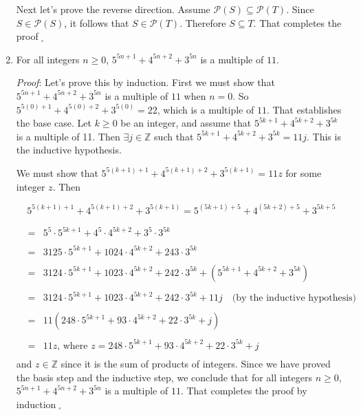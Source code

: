 \documentclass[12pt]{amsart}
\theoremstyle{definition}
\theoremstyle{remark}
\newcommand{\ints}{\mathbb Z}
\newcommand{\powerset}{\mathscr P}
\begin{document}
\begin{enumerate}
Next let's prove the reverse direction. Assume $\powerset{(S)}\subseteq \powerset{(T)}$. 
Since $S\in \powerset{(S)}$, it follows that $S\in \powerset{(T)}$. Therefore $S\subseteq T$. That completes the proof$\;_{\square}$\\

\newpage


\item For all integers $n\geq 0$, $5^{5n+1}+4^{5n+2}+3^{5n}$ is a multiple of $11$.


\bigskip
\bigskip

\emph{Proof}: Let's prove this by induction. First we must show that $5^{5n+1}+4^{5n+2}+3^{5n}$ is a multiple of $11$ when $n=0$.
So $5^{5(0)+1}+4^{5(0)+2}+3^{5(0)}=22$, which is a multiple of $11$. That establishes the base case.
Let $k\geq 0$ be an integer, and assume that $5^{5k+1}+4^{5k+2}+3^{5k}$ is a multiple of 11. 
Then $\exists j\in\ints$ such that $5^{5k+1}+4^{5k+2}+3^{5k}=11j$. This is the inductive hypothesis.

We must show that $5^{5(k+1)+1}+4^{5(k+1)+2}+3^{5(k+1)}=11z$ for some integer $z$. Then

$$5^{5(k+1)+1}+4^{5(k+1)+2}+3^{5(k+1)} = 5^{(5k+1)+5}+4^{(5k+2)+5}+3^{5k+5}$$

\begin{eqnarray*}
    &=& 5^5\cdot 5^{5k+1}+4^5\cdot 4^{5k+2}+3^5\cdot 3^{5k} \\
    \\
    &=& 3125\cdot 5^{5k+1}+1024\cdot 4^{5k+2}+243\cdot 3^{5k} \\
    \\
    &=& 3124\cdot 5^{5k+1}+1023\cdot 4^{5k+2}+242\cdot 3^{5k}+(5^{5k+1}+4^{5k+2}+3^{5k}) \\
    \\
    &=& 3124\cdot 5^{5k+1}+1023\cdot 4^{5k+2}+242\cdot 3^{5k}+11j \hspace{1em} \mbox{(by the inductive hypothesis)} \\
    \\
    &=& 11(248\cdot 5^{5k+1}+93\cdot 4^{5k+2}+22\cdot 3^{5k}+j) \\
    \\
    &=& 11z \mbox{, where } z=248\cdot 5^{5k+1}+93\cdot 4^{5k+2}+22\cdot 3^{5k}+j\\
\end{eqnarray*}
and $z\in\ints$ since it is the sum of products of integers.
Since we have proved the basis step and the inductive step, we conclude that for all integers $n\geq 0$, $5^{5n+1}+4^{5n+2}+3^{5n}$ is a multiple of $11$. 
That completes the proof by induction$\;_{\square}$\\


\end{enumerate}
\end{document}

